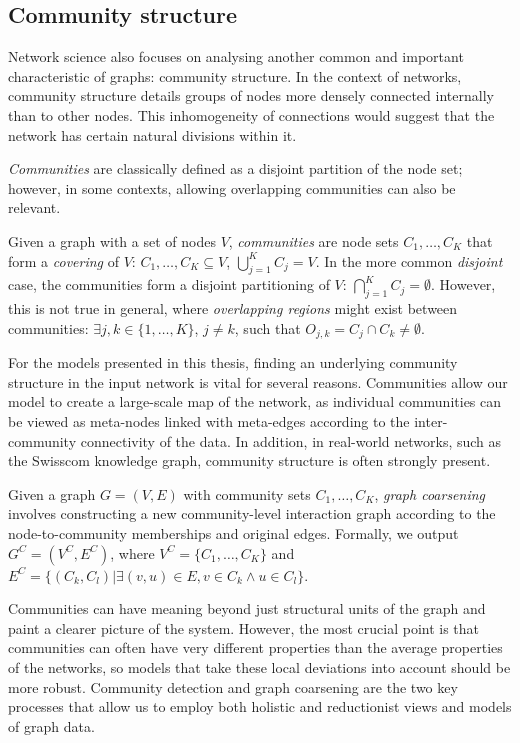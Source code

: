 \subsection{Community structure}
Network science also focuses on analysing another common and important characteristic of graphs: community structure. In the context of networks, community structure details groups of nodes more densely connected internally than to other nodes. This inhomogeneity of connections would suggest that the network has certain natural divisions within it.

\emph{Communities} are classically defined as a disjoint partition of the node set; however, in some contexts, allowing overlapping communities can also be relevant.
\begin{definition}
Given a graph with a set of nodes $V$, \emph{communities} are node sets $C_1, \dots, C_K$ that form a \emph{covering} of $V$: $C_1, \dots, C_K \subseteq V$, $\bigcup_{j=1}^{K}{C_j} = V$. In the more common \emph{disjoint} case, the communities form a disjoint partitioning of $V$: $\bigcap_{j=1}^{K}{C_j}=\emptyset$. However, this is not true in general, where \emph{overlapping regions} might exist between communities: $\exists j,k \in \{1,\dots,K\}$, $j \neq k$, such that $O_{j,k} = C_j \cap C_k \neq \emptyset$.
\end{definition} 

For the models presented in this thesis, finding an underlying community structure in the input network is vital for several reasons. Communities allow our model to create a large-scale map of the network, as individual communities can be viewed as meta-nodes linked with meta-edges according to the inter-community connectivity of the data. In addition, in real-world networks, such as the Swisscom knowledge graph, community structure is often strongly present.

\begin{definition}
    Given a graph $G=(V,E)$ with community sets $C_1, \dots, C_K$, \emph{graph coarsening} involves constructing a new community-level interaction graph according to the node-to-community memberships and original edges. Formally, we output $G^C=(V^C,E^C)$, where $V^C=\{C_1,\dots,C_K\}$ and $E^C=\{(C_k,C_l)|\exists (v,u) \in E,v \in C_k \wedge u \in C_l\}$.
\end{definition}

Communities can have meaning beyond just structural units of the graph and paint a clearer picture of the system. However, the most crucial point is that communities can often have very different properties than the average properties of the networks, so models that take these local deviations into account should be more robust. Community detection and graph coarsening are the two key processes that allow us to employ both holistic and reductionist views and models of graph data.


